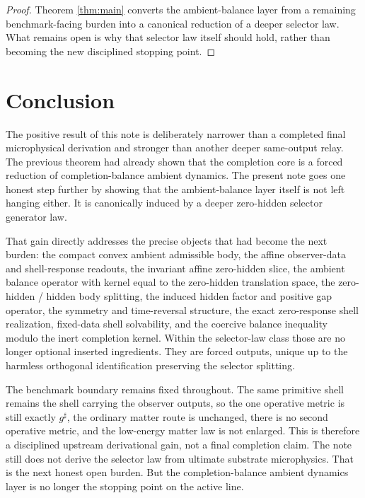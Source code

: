 \documentclass[11pt]{article}
\newcommand{\CompletedMetric}{g^{\sharp}}
\begin{document}
\begin{proof}
Theorem \ref{thm:main} converts the ambient-balance layer from a remaining benchmark-facing burden into a canonical reduction of a deeper selector law. What remains open is why that selector law itself should hold, rather than becoming the new disciplined stopping point.
\end{proof}

\section{Conclusion}

The positive result of this note is deliberately narrower than a completed final microphysical derivation and stronger than another deeper same-output relay. The previous theorem had already shown that the completion core is a forced reduction of completion-balance ambient dynamics. The present note goes one honest step further by showing that the ambient-balance layer itself is not left hanging either. It is canonically induced by a deeper zero-hidden selector generator law.

That gain directly addresses the precise objects that had become the next burden: the compact convex ambient admissible body, the affine observer-data and shell-response readouts, the invariant affine zero-hidden slice, the ambient balance operator with kernel equal to the zero-hidden translation space, the zero-hidden / hidden body splitting, the induced hidden factor and positive gap operator, the symmetry and time-reversal structure, the exact zero-response shell realization, fixed-data shell solvability, and the coercive balance inequality modulo the inert completion kernel. Within the selector-law class those are no longer optional inserted ingredients. They are forced outputs, unique up to the harmless orthogonal identification preserving the selector splitting.

The benchmark boundary remains fixed throughout. The same primitive shell remains the shell carrying the observer outputs, so the one operative metric is still exactly \(\CompletedMetric\), the ordinary matter route is unchanged, there is no second operative metric, and the low-energy matter law is not enlarged. This is therefore a disciplined upstream derivational gain, not a final completion claim. The note still does not derive the selector law from ultimate substrate microphysics. That is the next honest open burden. But the completion-balance ambient dynamics layer is no longer the stopping point on the active line.
\end{document}
